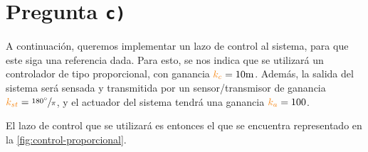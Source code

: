 \section{Pregunta \texttt{c)}}\label{pregunta-c}

A continuación, queremos implementar un lazo de control al sistema, para que
este siga una referencia dada. Para esto, se nos indica que se utilizará un
controlador de tipo proporcional, con ganancia $\nara{k_{c}} = 10\unit{m}$. Además, la
salida del sistema será sensada y transmitida por un sensor/transmisor
de ganancia $\nara{k_{st}} = \sfrac{\ang{180}}{\pi}$, y el actuador del sistema
tendrá una ganancia $\nara{k_{a}} = 100$.

El lazo de control que se utilizará es entonces el que se encuentra representado
en la \autoref{fig:control-proporcional}.

